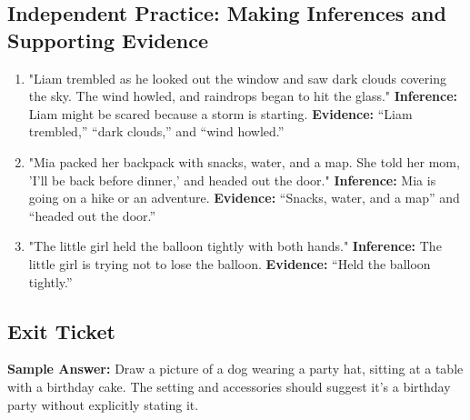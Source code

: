 \documentclass[12pt]{article}
\begin{document}
\subsection*{Independent Practice: Making Inferences and Supporting Evidence}
\begin{enumerate}
    \item "Liam trembled as he looked out the window and saw dark clouds covering the sky. The wind howled, and raindrops began to hit the glass."  
    \textbf{Inference:} Liam might be scared because a storm is starting.  
    \textbf{Evidence:} “Liam trembled,” “dark clouds,” and “wind howled.”
    
    \item "Mia packed her backpack with snacks, water, and a map. She told her mom, 'I’ll be back before dinner,' and headed out the door."  
    \textbf{Inference:} Mia is going on a hike or an adventure.  
    \textbf{Evidence:} “Snacks, water, and a map” and “headed out the door.”

    \item "The little girl held the balloon tightly with both hands."  
    \textbf{Inference:} The little girl is trying not to lose the balloon.  
    \textbf{Evidence:} “Held the balloon tightly.”
\end{enumerate}

\subsection*{Exit Ticket}
\textbf{Sample Answer:}  
Draw a picture of a dog wearing a party hat, sitting at a table with a birthday cake. The setting and accessories should suggest it’s a birthday party without explicitly stating it.
\end{document}
